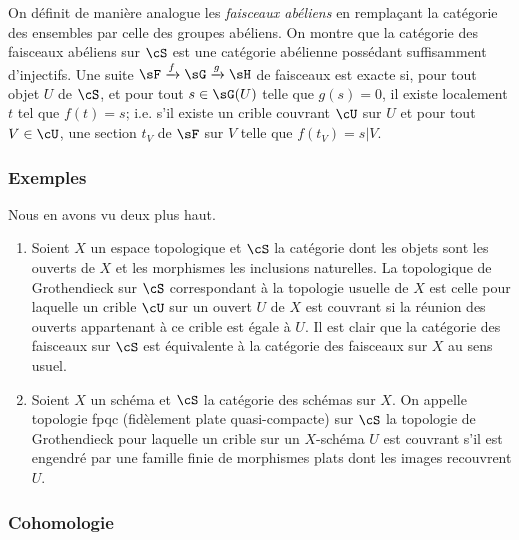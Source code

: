 On définit de manière analogue les \emph{faisceaux abéliens} en 
remplaçant la catégorie des ensembles par celle des groupes abéliens. On 
montre que la catégorie des faisceaux abéliens sur $\cS$ est une 
catégorie abélienne possédant suffisamment d'injectifs. Une suite 
$\sF\xrightarrow f \sG\xrightarrow g \sH$ de faisceaux est exacte si, pour 
tout objet $U$ de $\cS$, et pour tout $s\in \sG(U)$ telle que $g(s)=0$, 
il existe localement $t$ tel que $f(t)=s$; i.e. s'il existe un crible couvrant 
$\cU$ sur $U$ et pour tout $V\in\cU$, une section $t_V$ de $\sF$ sur $V$ telle 
que $f(t_V)=s|V$. 





\subsubsection{Exemples}\label{I:1-6-4}

Nous en avons vu deux plus haut. 

\begin{enumerate}[\indent a)]
  \item Soient $X$ un espace topologique et $\cS$ la catégorie dont les objets 
    sont les ouverts de $X$ et les morphismes les inclusions naturelles. La 
    topologique de Grothendieck sur $\cS$ correspondant à la topologie usuelle 
    de $X$ est celle pour laquelle un crible $\cU$ sur un ouvert $U$ de $X$ est 
    couvrant si la réunion des ouverts appartenant à ce crible est égale à 
    $U$. Il est clair que la catégorie des faisceaux sur $\cS$ est équivalente 
    à la catégorie des faisceaux sur $X$ au sens usuel. 
  \item Soient $X$ un schéma et $\cS$ la catégorie des schémas sur $X$. On 
    appelle topologie fpqc (fidèlement plate quasi-compacte) sur $\cS$ la 
    topologie de Grothendieck pour laquelle un crible sur un $X$-schéma $U$ est 
    couvrant s'il est engendré par une famille finie de morphismes plats dont  
    les images recouvrent $U$. 
\end{enumerate}





\subsubsection{Cohomologie}\label{I:1-6-5}


